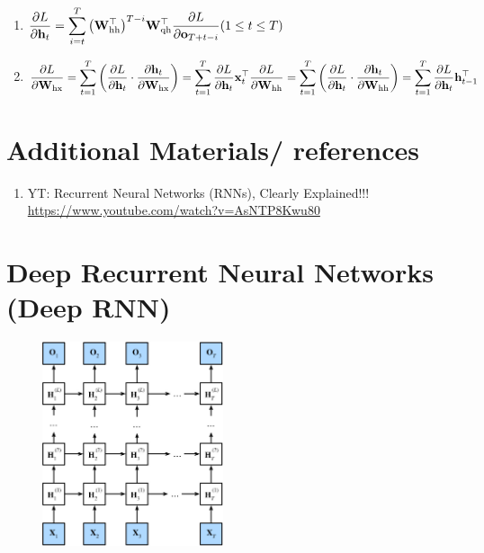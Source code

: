\begin{enumerate}[itemsep=0.2cm]
    \item 
    $
        \dfrac{\partial L}{\partial \mathbf{h}_t}
        = \dsum_{i=t}^T {\left(\mathbf{W}_\textrm{hh}^\top\right)}^{T-i} \mathbf{W}_\textrm{qh}^\top \dfrac{\partial L}{\partial \mathbf{o}_{T+t-i}}
        \hfill
        (1 \leq t \leq T)
    $

    \item 
    $
        \dfrac{\partial L}{\partial \mathbf{W}_\textrm{hx}}
        = \dsum_{t=1}^T \left(\dfrac{\partial L}{\partial \mathbf{h}_t} \cdot \dfrac{\partial \mathbf{h}_t}{\partial \mathbf{W}_\textrm{hx}}\right)
        = \dsum_{t=1}^T \dfrac{\partial L}{\partial \mathbf{h}_t} \mathbf{x}_t^\top
        \hfill
        \dfrac{\partial L}{\partial \mathbf{W}_\textrm{hh}}
        = \dsum_{t=1}^T \left(\dfrac{\partial L}{\partial \mathbf{h}_t} \cdot \dfrac{\partial \mathbf{h}_t}{\partial \mathbf{W}_\textrm{hh}}\right)
        = \dsum_{t=1}^T \dfrac{\partial L}{\partial \mathbf{h}_t} \mathbf{h}_{t-1}^\top
        \hfill
    $

    
\end{enumerate}


\section*{Additional Materials/ references}
\begin{enumerate}
    \item YT: Recurrent Neural Networks (RNNs), Clearly Explained!!!\\
    \url{https://www.youtube.com/watch?v=AsNTP8Kwu80}

\end{enumerate}



\section{Deep Recurrent Neural Networks (Deep RNN) \cite{dnn-1}} \label{Deep Recurrent Neural Networks}

\begin{figure}[H]
    \centering
    \includegraphics[width=\linewidth, height=6cm, keepaspectratio]{Pictures/Recurrent-Neural-Networks/deep-rnn.jpg}
\end{figure}


